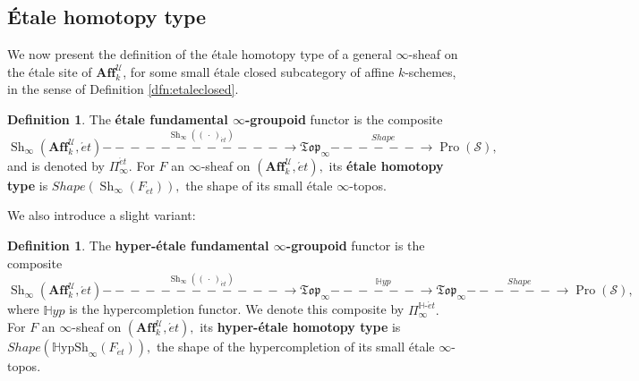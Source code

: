 \documentclass[12pt]{amsart}
\theoremstyle{definition}
\newtheorem{definition}[dummy]{Definition}
\newcommand{\cS}{\mathcal{S}}
\newcommand{\cU}{\mathcal{U}}
\newcommand{\Affku}{\mathbf{Aff}^{\cU}_{k}}
\newcommand{\Topi}{\mathfrak{Top}_\i}
\newcommand{\Sh}{\operatorname{Sh}}
\newcommand{\et}{\acute{e}t}
\renewcommand{\i}{\infty}
\def\Pro{\operatorname{Pro}}
\def\Shi{\Sh_\i}
\def\Hshi{\mathbb{H}\mathrm{ypSh}_\i}
\def\blank{\mspace{3mu}\cdot\mspace{3mu}}
\def\Shape{\mathit{Shape}}
\def\longlongrightarrow{-\!\!\!-\!\!\!-\!\!\!-\!\!\!-\!\!\!-\!\!\!\longrightarrow}
\def\longlonglongrightarrow{-\!\!\!-\!\!\!-\!\!\!-\!\!\!-\!\!\!-\!\!\!\longlongrightarrow}
\begin{document}
\subsection{\'Etale homotopy type}

We now present the definition of the \'etale homotopy type of a general $\i$-sheaf on the \'etale site of $\Affku$, for some small \'etale closed subcategory of affine $k$-schemes, in the sense of Definition \ref{dfn:etaleclosed}.

\begin{definition}\label{dfn:etalehomotopytype}
The \textbf{\'etale fundamental $\i$-groupoid} functor is the composite
$$\Shi\left(\Affku,\et\right) \stackrel{\Shi\left(\left(\blank\right)_{\et}\right)}{\longlonglongrightarrow} \Topi \stackrel{\Shape}{\longlongrightarrow} \Pro\left(\cS\right),$$ and is denoted by $\Pi^{\et}_\i$. For $F$ an $\i$-sheaf on $\left(\Affku,\et\right),$ its \textbf{\'etale homotopy type} is $\Shape\left(\Shi\left(F_{\et}\right)\right),$ the shape of its small \'etale $\i$-topos.
\end{definition}

We also introduce a slight variant:

\begin{definition}
The \textbf{hyper-\'etale fundamental $\i$-groupoid} functor is the composite 
$$\Shi\left(\Affku,\et\right) \stackrel{\Shi\left(\left(\blank\right)_{\et}\right)}{\longlonglongrightarrow} \Topi \stackrel{\mathbb{H}yp}{\longlongrightarrow} \Topi \stackrel{\Shape}{\longlongrightarrow} \Pro\left(\cS\right),$$ where $\mathbb{H}yp$ is the hypercompletion functor. We denote this composite by $\Pi^{\mathbb{H}\mbox{-}\et}_\i.$ For $F$ an $\i$-sheaf on $\left(\Affku,\et\right),$ its \textbf{hyper-\'etale homotopy type} is $\Shape\left(\Hshi\left(F_{\et}\right)\right),$ the shape of the hypercompletion of its small \'etale $\i$-topos.
\end{definition}
\end{document}
